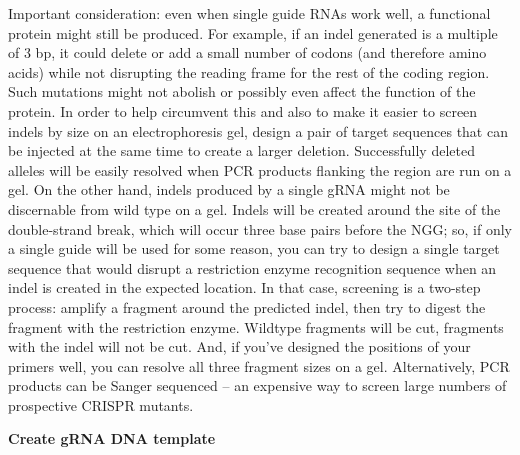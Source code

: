 \documentclass[
  letterpaper,
  DIV=11,
  numbers=noendperiod]{scrreprt}
\begin{document}
\begin{tcolorbox}[enhanced jigsaw, toprule=.15mm, breakable, coltitle=black, leftrule=.75mm, title=\textcolor{quarto-callout-note-color}{\faInfo}\hspace{0.5em}{Important Consideration}, bottomrule=.15mm, toptitle=1mm, bottomtitle=1mm, colframe=quarto-callout-note-color-frame, opacityback=0, colback=white, opacitybacktitle=0.6, colbacktitle=quarto-callout-note-color!10!white, rightrule=.15mm, titlerule=0mm, arc=.35mm, left=2mm]

Important consideration: even when single guide RNAs work well, a
functional protein might still be produced. For example, if an indel
generated is a multiple of 3 bp, it could delete or add a small number
of codons (and therefore amino acids) while not disrupting the reading
frame for the rest of the coding region. Such mutations might not
abolish or possibly even affect the function of the protein. In order to
help circumvent this and also to make it easier to screen indels by size
on an electrophoresis gel, design a pair of target sequences that can be
injected at the same time to create a larger deletion. Successfully
deleted alleles will be easily resolved when PCR products flanking the
region are run on a gel. On the other hand, indels produced by a single
gRNA might not be discernable from wild type on a gel. Indels will be
created around the site of the double-strand break, which will occur
three base pairs before the NGG; so, if only a single guide will be used
for some reason, you can try to design a single target sequence that
would disrupt a restriction enzyme recognition sequence when an indel is
created in the expected location. In that case, screening is a two-step
process: amplify a fragment around the predicted indel, then try to
digest the fragment with the restriction enzyme. Wildtype fragments will
be cut, fragments with the indel will not be cut. And, if you've
designed the positions of your primers well, you can resolve all three
fragment sizes on a gel. Alternatively, PCR products can be Sanger
sequenced -- an expensive way to screen large numbers of prospective
CRISPR mutants.

\end{tcolorbox}

\textbf{Create gRNA DNA template}
\end{document}
